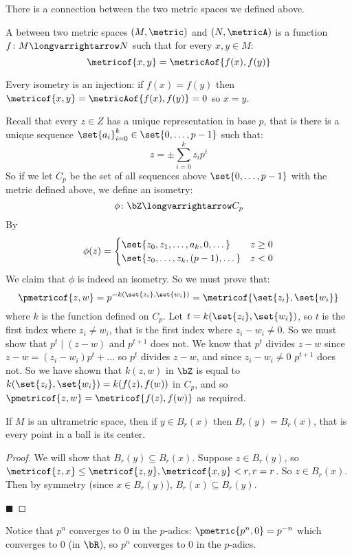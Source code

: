 \documentclass[10pt]{article}
\let\divides=\mid
\begin{document}
There is a connection between the two metric spaces we defined above.

\begin{defn*}

    A  between two metric spaces $(M,\metric)$ and $(N,\metricA)$ is a function $f\colon M\longvarrightarrow N$ such that for every $x,y\in M$:
    \[ \metricof{x,y} = \metricAof{f(x), f(y)} \]

\end{defn*}

Every isometry is an injection: if $f(x)=f(y)$ then $\metricof{x,y}=\metricAof{f(x),f(y)}=0$ so $x=y$.

Recall that every $z\in Z$ has a unique representation in base $p$, that is there is a unique sequence $\set{a_i}_{i=0}^k\in\set{0,\dots,p-1}$ such that:
\[ z = \pm\sum_{i=0}^k z_ip^i \]
So if we let $C_p$ be the set of all sequences above $\set{0,\dots,p-1}$ with the metric defined above, we define an isometry:
\[ \phi\colon\bZ\longvarrightarrow C_p \]
By
\[ \phi(z) = \begin{cases} \set{z_0, z_1,\dots,a_k,0,\dots} & z\geq0 \\ \set{z_0,\dots,z_k,(p-1),\dots} & z<0 \end{cases} \]
We claim that $\phi$ is indeed an isometry.
So we must prove that:
\[ \pmetricof{z,w} = p^{-k(\set{z_i}, \set{w_i})} = \metricof{\set{z_i}, \set{w_i}} \]
where $k$ is the function defined on $C_p$.
Let $t=k(\set{z_i}, \set{w_i})$, so $t$ is the first index where $z_i\neq w_i$, that is the first index where $z_i-w_i\neq0$.
So we must show that $p^t\divides(z-w)$ and $p^{t+1}$ does not.
We know that $p^t$ divides $z-w$ since $z-w=(z_i-w_i)p^t+\dots$ so $p^t$ divides $z-w$, and since $z_i-w_i\neq0$ $p^{t+1}$ does not.
So we have shown that $k(z,w)$ in $\bZ$ is equal to $k(\set{z_i},\set{w_i})=k(f(z),f(w))$ in $C_p$, and so $\pmetricof{z,w}=\metricof{f(z),f(w)}$ as required.

\begin{prop*}

    If $M$ is an ultrametric space, then if $y\in B_r(x)$ then $B_r(y)=B_r(x)$, that is every point in a ball is its center.

\end{prop*}

\begin{proof}

    We will show that $B_r(y)\subseteq B_r(x)$.
    Suppose $z\in B_r(y)$, so $\metricof{z,x}\leq\maxof{\metricof{z,y}, \metricof{x,y}}<\maxof{r,r}=r$.
    So $z\in B_r(x)$.
    Then by symmetry (since $x\in B_r(y)$), $B_r(x)\subseteq B_r(y)$.

    \hfill$\blacksquare$

\end{proof}

Notice that $p^n$ converges to $0$ in the $p$-adics: $\pmetric{p^n, 0}=p^{-n}$ which converges to $0$ (in $\bR$), so $p^n$ converges to $0$ in the $p$-adics.
\end{document}
